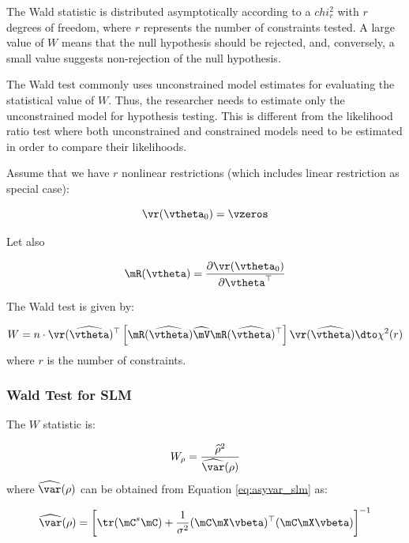 \documentclass[english,12pt]{book}\usepackage[]{graphicx}\usepackage[]{xcolor}
\begin{document}
The Wald statistic is distributed asymptotically according to a $chi^2_{r}$ with $r$ degrees of freedom, where $r$ represents the number of constraints tested. A large value of $W$ means that the null hypothesis should be rejected, and, conversely, a small value suggests non-rejection of the null hypothesis. 

The Wald test commonly uses unconstrained model estimates for evaluating the statistical value of $W$. Thus, the researcher needs to estimate only the unconstrained model for hypothesis testing. This is different from the likelihood ratio test where both unconstrained and constrained models need to be estimated in order to compare their likelihoods. 

\begin{definition}
Assume that we have $r$ nonlinear restrictions (which includes linear restriction as special case):

\begin{equation*}
\vr(\vtheta_0) = \vzeros
\end{equation*}

Let also 

\begin{equation*}
\mR(\vtheta) = \frac{\partial \vr(\vtheta_0)}{\partial \vtheta^\top}
\end{equation*}

The Wald test is given by:

\begin{equation}\label{eq:wald_test_def}
W = n\cdot \vr(\widehat{\vtheta})^\top\left[\mR(\widehat{\vtheta}) \widehat{\mV}\mR(\widehat{\vtheta})^\top\right]\vr(\widehat{\vtheta})\dto \chi^2(r)
\end{equation}
%
where $r$ is the number of constraints. 
\end{definition}

\subsubsection{Wald Test for SLM}

The $W$ statistic is:

\begin{equation}
W_{\rho} = \frac{\widehat{\rho}^2}{\widehat{\var}(\rho)}
\end{equation}
%
where $\widehat{\var}(\rho)$ can be obtained from Equation \ref{eq:asyvar_slm} as:

\begin{equation}
  \widehat{\var}(\rho) = \left[\tr(\mC^s\mC) + \frac{1}{\sigma^2}(\mC\mX\vbeta)^\top(\mC\mX\vbeta)\right]^{-1}
\end{equation}
\end{document}
